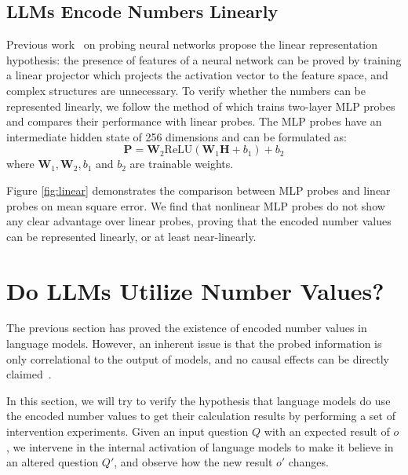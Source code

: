 \documentclass[11pt]{article}
\begin{document}
\subsection{LLMs Encode Numbers Linearly}
\label{ssec:linearity}
Previous work~\cite{nanda2023emergent, gurnee2023language} on probing neural networks propose the linear representation hypothesis: the presence of features of a neural network can be proved by training a linear projector which projects the activation vector to the feature space, and complex structures are unnecessary.
To verify whether the numbers can be represented linearly, we follow the method of \citet{gurnee2023language} which trains two-layer MLP probes and compares their performance with linear probes.
The MLP probes have an intermediate hidden state of 256 dimensions and can be formulated as:
\begin{equation}
    \mathbf{P} = \mathbf{W}_{2}\text{ReLU}(\mathbf{W}_{1}\mathbf{H}+b_{1})+b_{2}
\end{equation}
where $\mathbf{W}_{1}, \mathbf{W}_{2}, b_{1}$ and $b_{2}$ are trainable weights.

Figure \ref{fig:linear} demonstrates the comparison between MLP probes and linear probes on mean square error.
We find that nonlinear MLP probes do not show any clear advantage over linear probes, proving that the encoded number values can be represented linearly, or at least near-linearly.

\section{Do LLMs Utilize Number Values?}
The previous section has proved the existence of encoded number values in language models.
However, an inherent issue is that the probed information is only correlational to the output of models, and no causal effects can be directly claimed~\cite{belinkov2022probing}.

In this section, we will try to verify the hypothesis that language models do use the encoded number values to get their calculation results by performing a set of intervention experiments. 
Given an input question $Q$ with an expected result of $o$, we intervene in the internal activation of language models to make it believe in an altered question $Q'$, and observe how the new result $o'$ changes.
\end{document}
